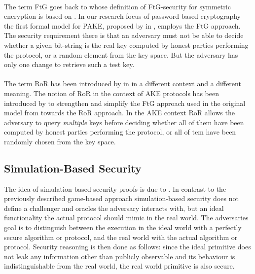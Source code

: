 \paragraph{}
The term \acl{FtG} goes back to \citeauthor{Bellare97} \cite{Bellare97} whose definition of \ac{FtG}-security for symmetric encryption is based on \cite{Goldwasser84} \cite{Micali86}.
In our research focus of password-based cryptography the first formal model for \ac{PAKE}, proposed by \citeauthor{Bellare2000} in \cite{Bellare2000}, employs the \ac{FtG} approach.
The security requirement there is that an adversary must not be able to decide whether a given bit-string is the real key computed by honest parties performing the protocol, or a random element from the key space.
But the adversary has only one change to retrieve such a test key.

\paragraph{}
The term \acl{RoR} has been introduced by \citeauthor{Bellare97} in \cite{Bellare97} in a different context and a different meaning.
The notion of \ac{RoR} in the context of \acl{AKE} protocols has been introduced by \citeauthor{Abdalla2005} to strengthen and simplify the \ac{FtG} approach used in the original model from \cite{Bellare2000} towards the \ac{RoR} approach.
In the \ac{AKE} context \ac{RoR} allows the adversary to query \emph{multiple} keys before deciding whether all of them have been computed by honest parties performing the protocol, or all of tem  have been randomly chosen from the key space.


\subsection{Simulation-Based Security}
The idea of simulation-based security proofs is due to \citeauthor{Goldreich87} \cite{Goldreich87} \citeyear{Goldreich87}.
In contrast to the previously described game-based approach simulation-based security does not define a challenger and oracles the adversary interacts with, but an ideal functionality the actual protocol should mimic in the real world.
The adversaries goal is to distinguish between the execution in the ideal world with a perfectly secure algorithm or protocol, and the real world with the actual algorithm or protocol.
Security reasoning is then done as follows: since the ideal primitive does not leak any information other than publicly observable and its behaviour is indistinguishable from the real world, the real world primitive is also secure.

